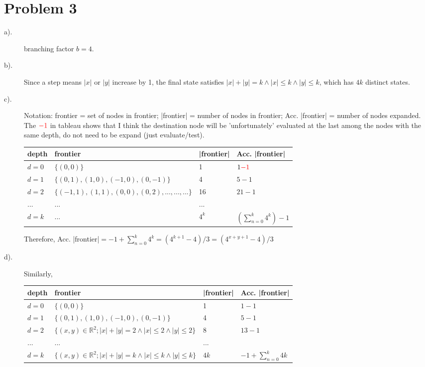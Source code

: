 \documentclass{mcmthesis}
\begin{document}
\section{Problem 3}
\begin{description}
	\item[a).] branching factor $b=4$.
	\item[b).] Since a step means $|x|$ or $|y|$ increase by 1, the final state satisfies $|x|+|y|=k \wedge |x|\le k \wedge |y| \le k$, which has $4k$ distinct states.
	\item[c).] Notation: frontier = set of nodes in frontier; |frontier| = number of nodes in frontier;   Acc. |frontier| = number of nodes expanded. The ${\color{red}-1}$ in tableau shows that  I think the destination node will be 'unfortunately' evaluated at the last among the nodes with the same depth, do not need to be expand (just evaluate/test). 
	
	\begin{tabular}{llll}
		\toprule
		depth & frontier & |frontier| & Acc. |frontier|\\
		\midrule 
		$d=0$ & $\{(0,0)\}$ & 1 & $1{\color{red}-1}$ \\
		$d=1$&$\{(0,1),(1,0),(-1,0),(0,-1)\}$&4&$5-1$\\
		$d=2$&   $\{(-1,1),(1,1),(0,0),(0,2),...,...,...\}$&16&$21-1$\\
		...&...&...&\\
		$d=k$&...&$4^k$&$(\sum_{n=0}^{k} 4^k) -1$\\
		\bottomrule
	\end{tabular}

	Therefore, Acc. |frontier|$=-1+\sum_{n=0}^{k} 4^k={(4^{k+1}-4)}/{3}={(4^{x+y+1}-4)}/{3}$
	
	\item[d).] Similarly, 
	
	\begin{tabular}{llll}
		\toprule
		depth & frontier & |frontier| & Acc. |frontier|\\
		\midrule 
		$d=0$ &$\{(0,0)\}$ & 1 & $1-1$ \\
		$d=1$&$\{(0,1),(1,0),(-1,0),(0,-1)\}$&4&$5-1$\\
		$d=2$&   $\{(x,y) \in \mathbb{R}^2; |x|+|y|=2\wedge |x|\le 2 \wedge |y|\le 2\}$&8&$13-1$\\
		...&...&...&\\
		$d=k$&$\{(x,y)\in \mathbb{R}^2; |x|+|y|=k\wedge |x|\le k \wedge |y|\le k\}$&$4k$&$-1+\sum_{n=0}^{k} 4k$\\
		\bottomrule
	\end{tabular}


\end{description}
\end{document}
